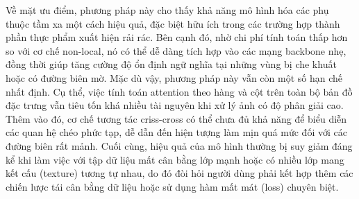 Về mặt ưu điểm, phương pháp này cho thấy khả năng mô hình hóa các phụ thuộc tầm xa một cách hiệu quả, đặc biệt hữu ích trong các trường hợp thành phần thực phẩm xuất hiện rải rác. Bên cạnh đó, nhờ chi phí tính toán thấp hơn so với cơ chế non-local, nó có thể dễ dàng tích hợp vào các mạng backbone nhẹ, đồng thời giúp tăng cường độ ổn định ngữ nghĩa tại những vùng bị che khuất hoặc có đường biên mờ. Mặc dù vậy, phương pháp này vẫn còn một số hạn chế nhất định. Cụ thể, việc tính toán attention theo hàng và cột trên toàn bộ bản đồ đặc trưng vẫn tiêu tốn khá nhiều tài nguyên khi xử lý ảnh có độ phân giải cao. Thêm vào đó, cơ chế tương tác criss-cross có thể chưa đủ khả năng để biểu diễn các quan hệ chéo phức tạp, dễ dẫn đến hiện tượng làm mịn quá mức đối với các đường biên rất mảnh. Cuối cùng, hiệu quả của mô hình thường bị suy giảm đáng kể khi làm việc với tập dữ liệu mất cân bằng lớp mạnh hoặc có nhiều lớp mang kết cấu (texture) tương tự nhau, do đó đòi hỏi người dùng phải kết hợp thêm các chiến lược tái cân bằng dữ liệu hoặc sử dụng hàm mất mát (loss) chuyên biệt.
